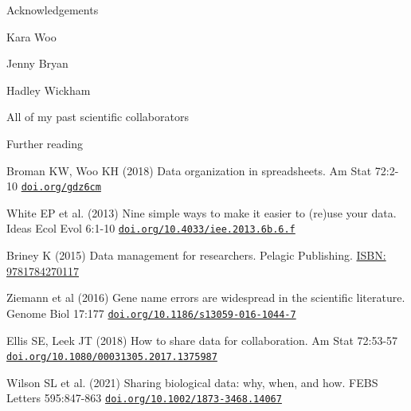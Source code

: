 \documentclass[aspectratio=169,12pt,t]{beamer}
\begin{document}
\begin{frame}{Acknowledgements}


  \bbi
\item[] Kara Woo
\item[] Jenny Bryan
\item[] Hadley Wickham
\item[] All of my past scientific collaborators
  \ei


\end{frame}


\begin{frame}{Further reading}


{\small

  \bi
\item Broman KW, Woo KH (2018) Data organization in spreadsheets. Am Stat 72:2-10
 \href{https://doi.org/gdz6cm}{\tt doi.org/gdz6cm}
\item White EP et al. (2013) Nine simple ways to make it easier to
  (re)use your data. Ideas Ecol Evol 6:1-10
  \href{https://doi.org/10.4033/iee.2013.6b.6.f}{\tt doi.org/10.4033/iee.2013.6b.6.f}
\item Briney K (2015) Data management for researchers. Pelagic
  Publishing.
  \href{https://pelagicpublishing.com/products/data-management-for-researchers-briney}{ISBN: 9781784270117}
\item Ziemann et al (2016) Gene name errors are widespread in the
  scientific literature. Genome Biol 17:177
  \href{https://doi.org/10.1186/s13059-016-1044-7}{\tt doi.org/10.1186/s13059-016-1044-7}
\item Ellis SE, Leek JT (2018) How to share data for collaboration.
  Am Stat 72:53-57
  \href{https://doi.org/10.1080/00031305.2017.1375987}{\tt doi.org/10.1080/00031305.2017.1375987}
\item Wilson SL et al. (2021) Sharing biological data: why, when, and
  how. FEBS Letters 595:847-863
  \href{https://doi.org/10.1002/1873-3468.14067}{\tt doi.org/10.1002/1873-3468.14067}
  \ei

}


\end{frame}
\end{document}
